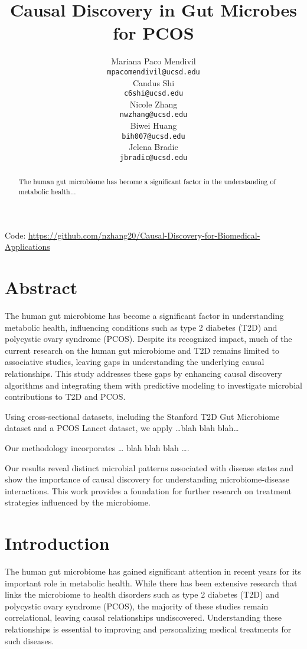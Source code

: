 \documentclass[12pt,letterpaper]{article}
\title{Causal Discovery in Gut Microbes for PCOS}
\author{Mariana Paco Mendivil \\
  {\tt mpacomendivil@ucsd.edu} \\\And
  Candus Shi \\
  {\tt c6shi@ucsd.edu} \\\And
  Nicole Zhang \\
  {\tt nwzhang@ucsd.edu} \\\And
  Biwei Huang \\
  {\tt bih007@ucsd.edu} \\\And
  Jelena Bradic \\
  {\tt jbradic@ucsd.edu}}
\begin{document}
\maketitle



\begin{abstract}
    \textcolor{black}{
    The human gut microbiome has become a significant factor in the understanding of metabolic health...}
\end{abstract}

\begin{center}

Code: \url{https://github.com/nzhang20/Causal-Discovery-for-Biomedical-Applications}
\end{center}

\maketoc
\clearpage


\section{Abstract}
The human gut microbiome has become a significant factor in understanding metabolic health, influencing conditions such as type 2 diabetes (T2D) and polycystic ovary syndrome (PCOS). Despite its recognized impact, much of the current research on the human gut microbiome and T2D remains limited to associative studies, leaving gaps in understanding the underlying causal relationships. This study addresses these gaps by enhancing causal discovery algorithms and integrating them with predictive modeling to investigate microbial contributions to T2D and PCOS.

Using cross-sectional datasets, including the Stanford T2D Gut Microbiome dataset and a PCOS Lancet dataset, we apply …blah blah blah…

Our methodology incorporates … blah blah blah ….

Our results reveal distinct microbial patterns associated with disease states and show the importance of causal discovery for understanding microbiome-disease interactions. This work provides a foundation for further research on treatment strategies influenced by the microbiome.


\section{Introduction}
The human gut microbiome has gained significant attention in recent years for its important role in metabolic health. While there has been extensive research that links the microbiome to health disorders such as type 2 diabetes (T2D) and polycystic ovary syndrome (PCOS), the majority of these studies remain correlational, leaving causal relationships undiscovered. Understanding these relationships is essential to improving and personalizing medical treatments for such diseases.
\end{document}
